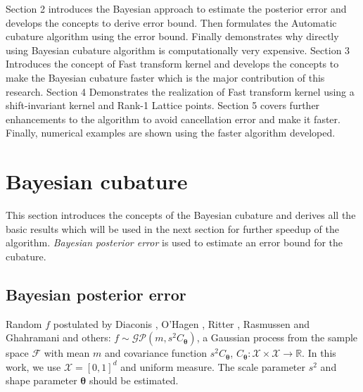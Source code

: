 \documentclass[smallextended]{svjour3}       %
\newcommand{\bm}[1]{\boldsymbol{#1}}
\newcommand{\vtheta}{{\bm{\theta}}}
\begin{document}
Section 2 introduces the Bayesian approach to estimate the posterior error and develops the concepts to derive error bound. Then formulates the Automatic cubature algorithm using the error bound. Finally demonstrates why directly using Bayesian cubature algorithm is computationally very expensive.
Section 3 Introduces the concept of Fast transform kernel and develops the concepts to make the Bayesian cubature faster which is the major contribution of this research.
Section 4 Demonstrates the realization of Fast transform kernel using a shift-invariant kernel and Rank-1 Lattice points.
Section 5 covers further enhancements to the algorithm to avoid cancellation error and make it faster. Finally, numerical examples are shown using the faster algorithm developed.




\section{Bayesian cubature}
\label{sec:1}

This section introduces the concepts of the Bayesian cubature and derives all the basic results which will be used in the next section for further speedup of the algorithm. \emph{Bayesian posterior error} \cite{Fred2017} is used to estimate an error bound for the cubature. 

\subsection{Bayesian posterior error}
\label{sec:2}

Random $f$ postulated by Diaconis \cite{DiaconisBayesian}, O'Hagen \cite{HagenBayes}, Ritter \cite{RiterAverage}, Rasmussen and Ghahramani \cite{RasmussenBayesian} and others: $f \sim \mathcal{GP}(m,s^2 C_\vtheta)$, a Gaussian process from the sample space $\mathcal{F}$ with mean $m$ and covariance function $s^2C_\vtheta$, $C_\vtheta: \mathcal{X} \times \mathcal{X} \to \mathbb{R} $. In this work, we use $\mathcal{X} = [0,1]^d$ and uniform measure.  The scale parameter $s^2$ and shape parameter $\vtheta$ should be estimated.
\end{document}
